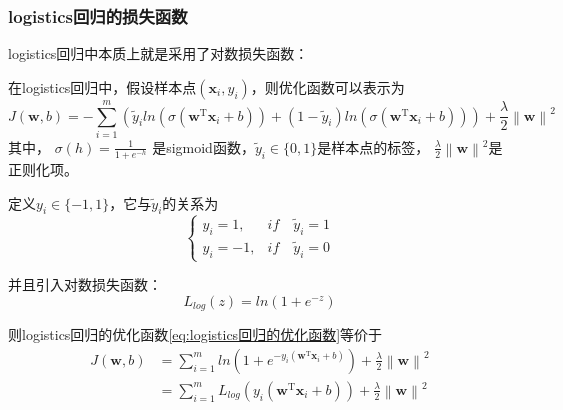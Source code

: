 \documentclass[withoutpreface,bwprint]{NoteBook}
\begin{document}
\subsubsection{logistics回归的损失函数}
logistics回归中本质上就是采用了对数损失函数：

在logistics回归中，假设样本点$(\mathbf{x}_i,y_i)$，则优化函数可以表示为
\begin{equation}
    \label{eq:logistics回归的优化函数}
    J(\mathbf{w},b) =-\sum_{i=1}^{m} \left ( \tilde{y}_i ln(\sigma (\mathbf{w}^\mathrm{T} \mathbf{x}_i +b)) + (1-\tilde{y}_i) ln(\sigma (\mathbf{w}^\mathrm{T} \mathbf{x}_i +b)) \right ) + \frac{\lambda}{2} \left\| \mathbf{w} \right\|^2 
\end{equation}
其中，
$
\sigma (h) = \frac{1}{1+e^{-h}}
$
是sigmoid函数，$\tilde{y}_i \in \{0,1\}$是样本点的标签，
$
\frac{\lambda}{2} \left\| \mathbf{w} \right\|^2 
$是正则化项。

定义$y_i \in \{-1,1\}$，它与$\tilde{y}_i$的关系为
\begin{equation}
    \label{eq:yi和tilde_yi的关系}
    \begin{cases}
        y_i = 1, & if \quad \tilde{y}_i = 1 \\
        y_i = -1, & if \quad \tilde{y}_i = 0
    \end{cases}
\end{equation}

并且引入对数损失函数：
\begin{equation}
    L_{log}(z) = ln(1 + e^{-z})
\end{equation}

则logistics回归的优化函数\cref{eq:logistics回归的优化函数}等价于
\begin{align}
    \label{eq:logistics回归的优化函数2}
    J(\mathbf{w},b) &= \sum_{i=1}^{m} ln(1 + e^{-y_i(\mathbf{w}^\mathrm{T} \mathbf{x}_i + b)}) + \frac{\lambda}{2} \left\| \mathbf{w} \right\|^2 \\
                    &= \sum_{i=1}^{m} L_{log}(y_i(\mathbf{w}^\mathrm{T} \mathbf{x}_i + b)) + \frac{\lambda}{2} \left\| \mathbf{w} \right\|^2
\end{align}
\end{document}
